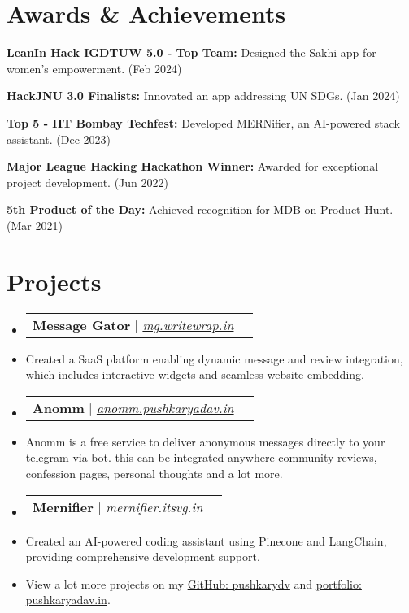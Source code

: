 \documentclass[letterpaper,11pt]{article}
\makeatletter
\newcommand{\resumeItem}[1]{
  \item\small{
    {#1 \vspace{-2pt}}
  }
}
\newcommand{\resumeProjectHeading}[2]{
    \vspace{-2pt}\item
    \begin{tabular*}{0.97\textwidth}{l@{\extracolsep{\fill}}r}
      \small#1 & #2 \\
    \end{tabular*}\vspace{-7pt}
}
\newcommand{\resumeSubHeadingListStart}{\begin{itemize}[leftmargin=0.15in, label={}]}
\newcommand{\resumeSubHeadingListEnd}{\end{itemize}}
\makeatother
\begin{document}
\section{Awards \& Achievements}
  \vspace{2pt}
  \resumeSubHeadingListStart
  \small{
    \item{
    
    \textbf{LeanIn Hack IGDTUW 5.0 - Top Team:}{ Designed the Sakhi app for women's empowerment. (Feb 2024)}
    
    \textbf{HackJNU 3.0 Finalists:}{ Innovated an app addressing UN SDGs. (Jan 2024)}
    
    \textbf{Top 5 - IIT Bombay Techfest:}{ Developed MERNifier, an AI-powered stack assistant. (Dec 2023)}
    
    \textbf{Major League Hacking Hackathon Winner:}{ Awarded for exceptional project development. (Jun 2022)}
    
    \textbf{5th Product of the Day:}{ Achieved recognition for MDB on Product Hunt. (Mar 2021)}

    }}
  \resumeSubHeadingListEnd

\section{Projects}
    \resumeSubHeadingListStart
    
    \resumeProjectHeading{\textbf{Message Gator} | \emph{\href{http://mg.writewrap.in}{mg.writewrap.in}}}{}
    \resumeItem{Created a SaaS platform enabling dynamic message and review integration, which includes interactive widgets and seamless website embedding.}
    
    \resumeProjectHeading{\textbf{Anomm} | \emph{\href{http://anomm.pushkaryadav.in}{anomm.pushkaryadav.in}}}{}
    \resumeItem{Anomm is a free service to deliver anonymous messages directly to your telegram via bot. this can be integrated anywhere community reviews, confession pages, personal thoughts and a lot more.}
    
    \resumeProjectHeading{\textbf{Mernifier} | \emph{mernifier.itsvg.in}}{}
    \resumeItem{Created an AI-powered coding assistant using Pinecone and LangChain, providing comprehensive development support.}
    
    \resumeItem{View a lot more projects on my \href{http://github.com/pushkarydv}{GitHub: pushkarydv} and \href{https://pushkaryadav.in}{portfolio: pushkaryadav.in}.}
    
    \resumeSubHeadingListEnd

\end{document}

